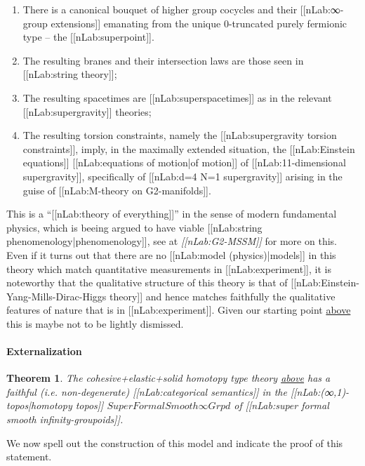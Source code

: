 \documentclass[12pt,titlepage]{article}
\theoremstyle{plain}
\newtheorem{theorem}{Theorem}
\theoremstyle{definition}
\theoremstyle{remark}
\begin{document}
\begin{enumerate}%
\item There is a canonical bouquet of higher group cocycles and their [[nLab:∞-group extensions]] emanating from the unique 0-truncated purely fermionic type -- the [[nLab:superpoint]].


\item The resulting branes and their intersection laws are those seen in [[nLab:string theory]];


\item The resulting spacetimes are [[nLab:superspacetimes]] as in the relevant [[nLab:supergravity]] theories;


\item The resulting torsion constraints, namely the [[nLab:supergravity torsion constraints]], imply, in the maximally extended situation, the [[nLab:Einstein equations]] [[nLab:equations of motion|of motion]] of [[nLab:11-dimensional supergravity]], specifically of [[nLab:d=4 N=1 supergravity]] arising in the guise of [[nLab:M-theory on G2-manifolds]].



\end{enumerate}
This is a ``[[nLab:theory of everything]]'' in the sense of modern fundamental physics, which is beeing argued to have viable [[nLab:string phenomenology|phenomenology]], see at \emph{[[nLab:G2-MSSM]]} for more on this. Even if it turns out that there are no [[nLab:model (physics)|models]] in this theory which match quantitative measurements in [[nLab:experiment]], it is noteworthy that the qualitative structure of this theory is that of [[nLab:Einstein-Yang-Mills-Dirac-Higgs theory]] and hence matches faithfully the qualitative features of nature that is in [[nLab:experiment]]. Given our starting point \hyperlink{TheGround}{above} this is maybe not to be lightly dismissed.

\hypertarget{Externalization}{}\paragraph*{{Externalization}}\label{Externalization}

\begin{theorem}
\label{SupergeometryIsModel}\hypertarget{SupergeometryIsModel}{}
The cohesive+elastic+solid homotopy type theory \hyperlink{ObjectiveLogic}{above} has a faithful (i.e. non-degenerate) [[nLab:categorical semantics]] in the [[nLab:(∞,1)-topos|homotopy topos]] $SuperFormalSmooth\infty Grpd$ of \emph{[[nLab:super formal smooth infinity-groupoids]]}.

\end{theorem}
We now spell out the construction of this model and indicate the proof of this statement.
\end{document}
